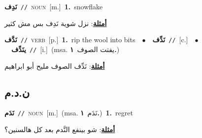 \documentclass[10pt,a4paper,twoside]{article} %
\begin{document}
\begin{multicols}{2}
{\setlength\topsep{0pt}\textbf{\foreignlanguage{arabic}{نَدِف}}\ {\color{gray}\texttt{//}\color{black}}\ \textsc{noun}\ [m.]\ \textbf{1.}~snowflake\  \begin{flushright}\color{gray}\foreignlanguage{arabic}{\textbf{\underline{\foreignlanguage{arabic}{أمثلة}}}: نزل شوية نَدِف بس مش كثير}\end{flushright}\color{black}} \vspace{2mm}

{\setlength\topsep{0pt}\textbf{\foreignlanguage{arabic}{نَدَّف}}\ {\color{gray}\texttt{//}\color{black}}\ \textsc{verb}\ [p.]\ \textbf{1.}~rip the wool into bits\ \ $\bullet$\ \ \setlength\topsep{0pt}\textbf{\foreignlanguage{arabic}{نَدِّف}}\ {\color{gray}\texttt{//}\color{black}}\ [c.]\ \ $\bullet$\ \ \setlength\topsep{0pt}\textbf{\foreignlanguage{arabic}{ينَدِّف}}\ {\color{gray}\texttt{//}\color{black}}\ [i.]\ \color{gray}(msa. \foreignlanguage{arabic}{يفتت الصوف}~\foreignlanguage{arabic}{\textbf{١.}})\color{black}\  \begin{flushright}\color{gray}\foreignlanguage{arabic}{\textbf{\underline{\foreignlanguage{arabic}{أمثلة}}}: نَدِّف الصوف مليح أبو ابراهيم}\end{flushright}\color{black}} \vspace{2mm}

\vspace{-3mm}
\subsection*{\color{blue}\foreignlanguage{arabic}{ن.د.م}\color{blue}{}} 

{\setlength\topsep{0pt}\textbf{\foreignlanguage{arabic}{نَدَم}}\ {\color{gray}\texttt{//}\color{black}}\ \textsc{noun}\ [m.]\ \color{gray}(msa. \foreignlanguage{arabic}{نَدَم}~\foreignlanguage{arabic}{\textbf{١.}})\color{black}\ \textbf{1.}~regret\  \begin{flushright}\color{gray}\foreignlanguage{arabic}{\textbf{\underline{\foreignlanguage{arabic}{أمثلة}}}: شو بينفع النَّدم بعد كل هالسنين؟}\end{flushright}\color{black}} \vspace{2mm}


\end{multicols}
\end{document}

